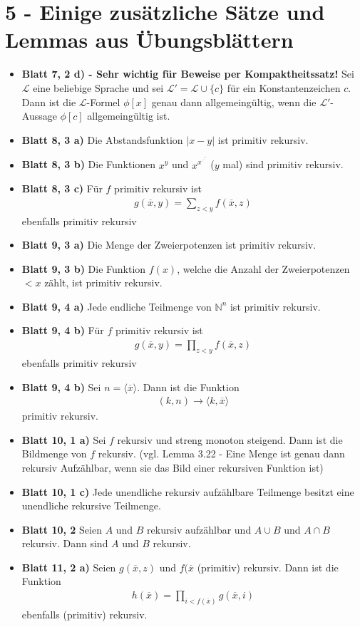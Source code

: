 \documentclass{scrartcl}
\newcommand{\goedel}[1]{\langle#1\rangle}
\def\rddots#1{\cdot^{\cdot^{\cdot^{#1}}}}
\begin{document}
\section*{5 - Einige zusätzliche Sätze und Lemmas aus Übungsblättern}
\begin{itemize}
    \item{\textbf{Blatt 7, 2 d) - Sehr wichtig für Beweise per Kompaktheitssatz!}} Sei $\mathcal{L}$ eine beliebige Sprache und sei $\mathcal{L}' = \mathcal{L} \cup \{c\}$ für ein Konstantenzeichen $c$. Dann ist die $\mathcal{L}$-Formel $\phi[x]$ genau dann allgemeingültig, wenn die $\mathcal{L}'$-Aussage $\phi[c]$ allgemeingültig ist. 
    \item{\textbf{Blatt 8, 3 a)}} Die Abstandsfunktion $|x-y|$ ist primitiv rekursiv.
    \item{\textbf{Blatt 8, 3 b)}} Die Funktionen $x^y$ und $x^{x^{\rddots x}}$ ($y$ mal) sind primitiv rekursiv.
    \item{\textbf{Blatt 8, 3 c)}} Für $f$ primitiv rekursiv ist
    \begin{align*}
        g(\overline{x},y) = \sum_{z < y} f(\overline{x},z) 
    \end{align*}
    ebenfalls primitiv rekursiv
    \item{\textbf{Blatt 9, 3 a)}} Die Menge der Zweierpotenzen ist primitiv rekursiv.
    \item{\textbf{Blatt 9, 3 b)}} Die Funktion $f(x)$, welche die Anzahl der Zweierpotenzen $< x$ zählt, ist primitiv rekursiv.
    \item{\textbf{Blatt 9, 4 a)}} Jede endliche Teilmenge von $\mathbb{N}^n$ ist primitiv rekursiv.
    \item{\textbf{Blatt 9, 4 b)}}  Für $f$ primitiv rekursiv ist
    \begin{align*}
        g(\overline{x},y) = \prod_{z < y} f(\overline{x},z) 
    \end{align*}
    ebenfalls primitiv rekursiv
    \item{\textbf{Blatt 9, 4 b)}} Sei $n = \goedel{\overline{x}}$. Dann ist die Funktion
    \begin{align*}
        (k,n) \to \goedel{k,\overline{x}}
    \end{align*}
    primitiv rekursiv.
    \item{\textbf{Blatt 10, 1 a)}} Sei $f$ rekursiv und streng monoton steigend. Dann ist die Bildmenge von $f$ rekursiv. (vgl. Lemma 3.22 - Eine Menge ist genau dann rekursiv Aufzählbar, wenn sie das Bild einer rekursiven Funktion ist)
    \item{\textbf{Blatt 10, 1 c)}} Jede unendliche rekursiv aufzählbare Teilmenge besitzt eine unendliche rekursive Teilmenge.
    \item{\textbf{Blatt 10, 2}} Seien $A$ und $B$ rekursiv aufzählbar und $A \cup B$ und $A \cap B$ rekursiv. Dann sind $A$ und $B$ rekursiv.
    \item{\textbf{Blatt 11, 2 a)}} Seien $g(\overline{x},z)$ und $f(\overline{x}$ (primitiv) rekursiv. Dann ist die Funktion
    \begin{align*}
        h(\overline{x}) = \prod_{i < f(\overline{x})} g(\overline{x},i)
    \end{align*}
    ebenfalls (primitiv) rekursiv.
\end{itemize}
\end{document}
